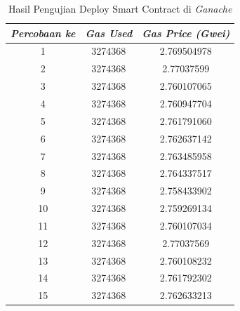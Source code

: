 \begin{enumerate}
        \begin{longtable}{|c|c|c|}
          \caption{Hasil Pengujian Deploy Smart Contract di \emph{Ganache}}
          \label{tb:UjiDeployGanache}                                                                \\
          \hline
          \rowcolor[HTML]{C0C0C0}
          \textbf{\emph{Percobaan ke}} & \textbf{\emph{Gas Used}} & \textbf{\emph{Gas Price (Gwei)}} \\
          \hline
          1                            & 3274368                  & 2.769504978                      \\
          2                            & 3274368                  & 2.77037599                       \\
          3                            & 3274368                  & 2.760107065                      \\
          4                            & 3274368                  & 2.760947704                      \\
          5                            & 3274368                  & 2.761791060                      \\
          6                            & 3274368                  & 2.762637142                      \\
          7                            & 3274368                  & 2.763485958                      \\
          8                            & 3274368                  & 2.764337517                      \\
          9                            & 3274368                  & 2.758433902                      \\
          10                           & 3274368                  & 2.759269134                      \\
          11                           & 3274368                  & 2.760107034                      \\
          12                           & 3274368                  & 2.77037569                       \\
          13                           & 3274368                  & 2.760108232                      \\
          14                           & 3274368                  & 2.761792302                      \\
          15                           & 3274368                  & 2.762633213                      \\
          \hline
        \end{longtable}


\end{enumerate}
